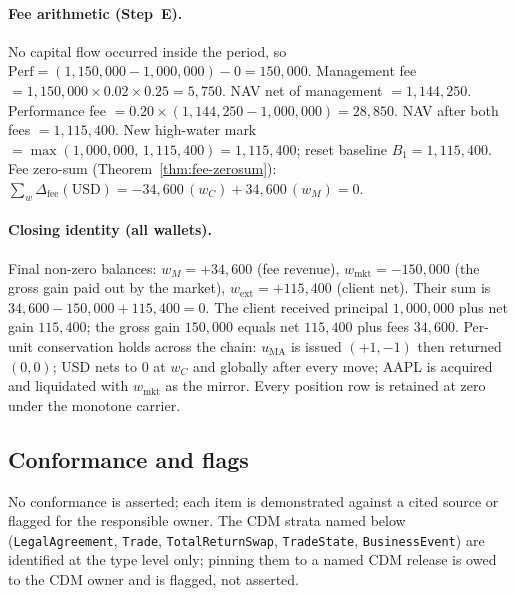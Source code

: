 \paragraph{Fee arithmetic (Step~E).} No capital flow occurred inside the period, so
$\mathrm{Perf}=(1{,}150{,}000-1{,}000{,}000)-0=150{,}000$. Management fee
$=1{,}150{,}000\times0.02\times0.25=5{,}750$. NAV net of management $=1{,}144{,}250$. Performance
fee $=0.20\times(1{,}144{,}250-1{,}000{,}000)=28{,}850$. NAV after both fees $=1{,}115{,}400$. New
high-water mark $=\max(1{,}000{,}000,\,1{,}115{,}400)=1{,}115{,}400$; reset baseline
$B_1=1{,}115{,}400$. Fee zero-sum (Theorem~\ref{thm:fee-zerosum}):
$\sum_w\Delta_{\text{fee}}(\text{USD})=-34{,}600\,(w_C)+34{,}600\,(w_M)=0$.

\paragraph{Closing identity (all wallets).} Final non-zero balances: $w_M=+34{,}600$ (fee revenue),
$w_{\text{mkt}}=-150{,}000$ (the gross gain paid out by the market), $w_{\text{ext}}=+115{,}400$
(client net). Their sum is $34{,}600-150{,}000+115{,}400=0$. The client received principal
$1{,}000{,}000$ plus net gain $115{,}400$; the gross gain $150{,}000$ equals net $115{,}400$ plus
fees $34{,}600$. Per-unit conservation holds across the chain: $u_{\mathrm{MA}}$ is issued
$(+1,-1)$ then returned $(0,0)$; USD nets to $0$ at $w_C$ and globally after every move; AAPL is
acquired and liquidated with $w_{\text{mkt}}$ as the mirror. Every position row is retained at zero
under the monotone carrier.

\subsection{Conformance and flags}
\label{sec:sec09-conformance}

No conformance is asserted; each item is demonstrated against a cited source or flagged for the
responsible owner. The CDM strata named below (\texttt{LegalAgreement}, \texttt{Trade},
\texttt{TotalReturnSwap}, \texttt{TradeState}, \texttt{BusinessEvent}) are identified at the type
level only; pinning them to a named CDM release is owed to the CDM owner and is flagged, not
asserted.

